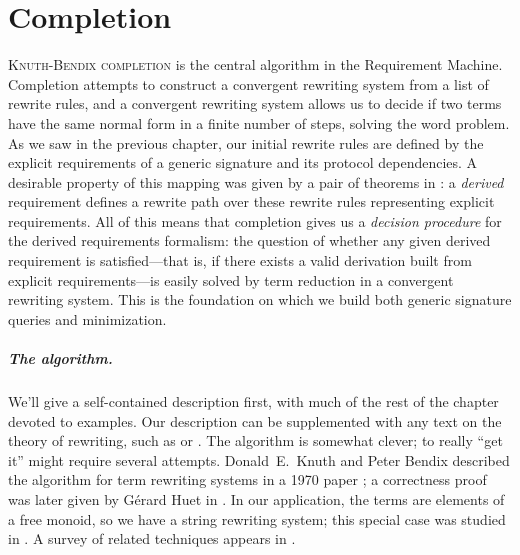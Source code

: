 \documentclass[../generics]{subfiles}
\begin{document}
\chapter{Completion}\label{completion}

%
\lettrine{K}{nuth-Bendix completion} is the central algorithm in the Requirement Machine. Completion attempts to construct a convergent rewriting system from a list of rewrite rules, and a convergent rewriting system allows us to decide if two terms have the same normal form in a finite number of steps, solving the word problem. As we saw in the previous chapter, our initial rewrite rules are defined by the explicit requirements of a generic signature and its protocol dependencies. A desirable property of this mapping was given by a pair of theorems in : a \emph{derived} requirement defines a rewrite path over these rewrite rules representing explicit requirements. All of this means that completion gives us a \emph{decision procedure} for the derived requirements formalism: the question of whether any given derived requirement is satisfied---that is, if there exists a valid derivation built from explicit requirements---is easily solved by term reduction in a convergent rewriting system. This is the foundation on which we build both generic signature queries and minimization.

\paragraph{The algorithm.} We'll give a self-contained description first, with much of the rest of the chapter devoted to examples. Our description can be supplemented with any text on the theory of rewriting, such as \cite{book2012string} or \cite{andallthat}. The algorithm is somewhat clever; to really ``get it'' might require several attempts. Donald~E.~Knuth and Peter Bendix described the algorithm for term rewriting systems in a 1970 paper \cite{Knuth1983}; a correctness proof was later given by G\'erard Huet in \cite{HUET198111}. In our application, the terms are elements of a free monoid, so we have a string rewriting system; this special case was studied in \cite{narendran}. A survey of related techniques appears in \cite{BUCHBERGER19873}.
\end{document}

